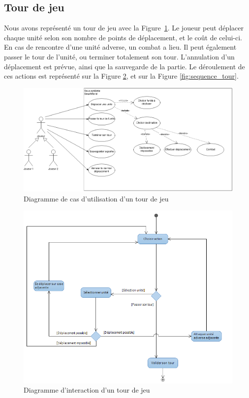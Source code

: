 \documentclass[a4paper]{article}
\begin{document}
\clearpage
	\subsection{Tour de jeu}
Nous avons représenté un tour de jeu avec la Figure~\ref{fig:cas_tour}. Le joueur peut déplacer chaque unité selon son nombre de points de déplacement, et le coût de celui-ci. En cas de rencontre d'une unité adverse, un combat a lieu. Il peut également passer le tour de l'unité, ou terminer totalement son tour. L'annulation d'un déplacement est prévue, ainsi que la sauvegarde de la partie. Le déroulement de ces actions est représenté sur la Figure \ref{fig:inter_tour}, et sur la Figure \ref{fig:sequence_tour}.

\begin{figure}[ht]
\centering
	\includegraphics[width=1\textwidth]{../Schemas/CU_Tour.png}
		\caption{Diagramme de cas d'utilisation d'un tour de jeu}
		\label{fig:cas_tour}
\end{figure}

\begin{figure}[ht]
\centering
	\includegraphics[width=1\textwidth]{../Schemas/Interaction_Tour.png}
		\caption{Diagramme d'interaction d'un tour de jeu}
		\label{fig:inter_tour}
\end{figure}
\end{document}
